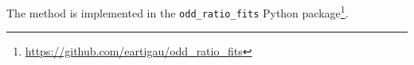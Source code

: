 The method is implemented in the \texttt{odd\_ratio\_fits} Python package\footnote{%
    \url{https://github.com/eartigau/odd_ratio_fits}}.



%
%
%
%
%
